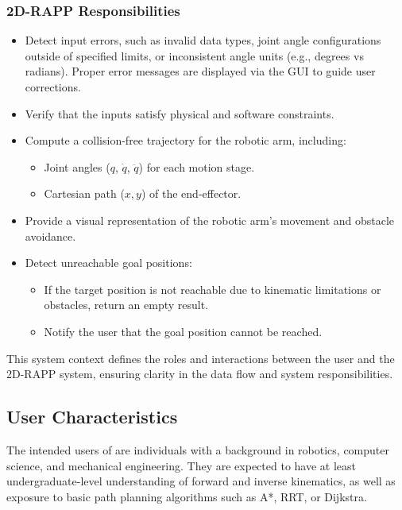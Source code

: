 \documentclass[12pt]{article}
\begin{document}
\subsubsection*{2D-RAPP Responsibilities}
\begin{itemize}
    \item  Detect input errors, such as invalid data types, joint angle configurations outside of specified limits, or inconsistent angle units (e.g., degrees vs radians). Proper error messages are displayed via the GUI to guide user corrections.
    \item Verify that the inputs satisfy physical and software constraints.
    \item Compute a collision-free trajectory for the robotic arm, including:
    \begin{itemize}
        \item Joint angles (\(q\), \(\dot{q}\), \(\ddot{q}\)) for each motion stage.
        \item Cartesian path (\(x, y\)) of the end-effector.
    \end{itemize}
    \item Provide a visual representation of the robotic arm's movement and obstacle avoidance.
    \item Detect unreachable goal positions:
    \begin{itemize}
        \item If the target position is not reachable due to kinematic limitations or obstacles, return an empty result.
        \item Notify the user that the goal position cannot be reached.
    \end{itemize}
\end{itemize}

This system context defines the roles and interactions between the user and the 2D-RAPP system, ensuring clarity in the data flow and system responsibilities.


\subsection{User Characteristics} \label{SecUserCharacteristics}
The intended users of \progname{} are individuals with a background in robotics, computer science, and mechanical engineering. They are expected to have at least undergraduate-level understanding of forward and inverse kinematics, as well as exposure to basic path planning algorithms such as A*, RRT, or Dijkstra.
\end{document}
